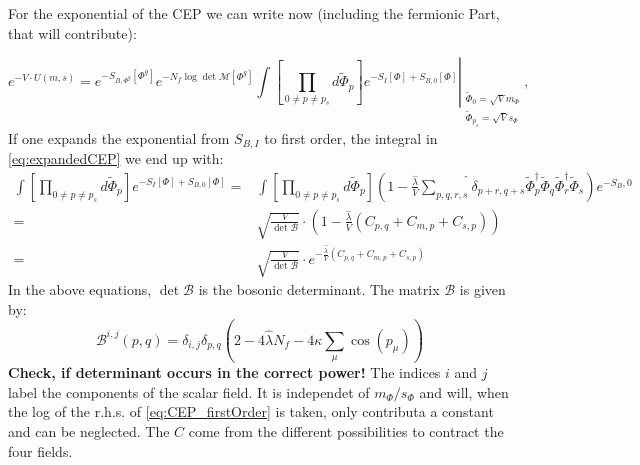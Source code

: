 For the exponential of the CEP we can write now (including the fermionic Part, that will contribute):

\begin{equation} \label{eq:expandedCEP}
 e^{-V\cdot U(m,s)} = e^{-S_{B,\Phi^g}[\Phi^g]} e^{-N_f \log \det \mathcal{M}[\Phi^g]} 
                      \int \left. \left[\prod\limits_{0 \neq p \neq p_s}  d \tilde \Phi_p \right]   
                      e^{-S_{I}[\Phi] +  S_{B,0}[\Phi]}
                       \right|_{ \begin{array}{l} \scriptscriptstyle \tilde \Phi_0=\sqrt{V} m_{\Phi} \\ 
                                     \scriptscriptstyle \tilde \Phi_{p_s}=\sqrt{V}s_{\Phi} \end{array}},
\end{equation}
If one expands the exponential from $S_{B,I}$ to first order, the integral in \eqref{eq:expandedCEP} we end up with:
\begin{align}\label{eq:CEP_firstOrder}
 \int \left[ \prod\limits_{0 \neq p \neq p_s}  d \tilde \Phi_p \right]   
                      e^{-S_{I}[\Phi] +  S_{B,0}[\Phi]} =& \int \left[ \prod\limits_{0 \neq p \neq p_s}  d \tilde \Phi_p \right] 
                      \left( 1 - \frac{\hat\lambda}{V} \widehat{\sum\limits_{p,q,r,s}}\delta_{p+r,q+s} 
                      \tilde\Phi_p^{\dagger} \tilde\Phi_q \tilde\Phi_r^{\dagger} \tilde\Phi_s \right)e^{-S_B,0} \nonumber \\
                      =& \sqrt{\frac{V}{\det \mathcal{B}}} \cdot \left(1 - \frac{\hat\lambda}{V} \left( C_{p,q} + C_{m,p} + C_{s,p} \right) \right) \nonumber \\
                      =& \sqrt{\frac{V}{\det \mathcal{B}}} \cdot e^{-\frac{\hat\lambda}{V} \left( C_{p,q} + C_{m,p} + C_{s,p} \right)}
\end{align}
In the above equations, $\det\mathcal{B}$ is the bosonic determinant. The matrix $\mathcal{B}$ is given by:
\begin{equation}\label{eq:def_BosonicDeterminant}
\mathcal{B}^{i,j}(p,q)=\delta_{i,j}\delta_{p,q} \left( 2 - 4 \hat\lambda N_f - 4 \kappa \sum\limits_{\mu} \cos(p_{\mu}) \right)
\end{equation}
\textbf{Check, if determinant occurs in the correct power!}
The indices $i$ and $j$ label the components of the scalar field. It is independet of $m_{\Phi}/s_{\Phi}$ and will, 
when the log of the r.h.s. of \eqref{eq:CEP_firstOrder} is taken, only contributa a constant and can be neglected.
The $C$ come from the different possibilities to contract the four fields. 
